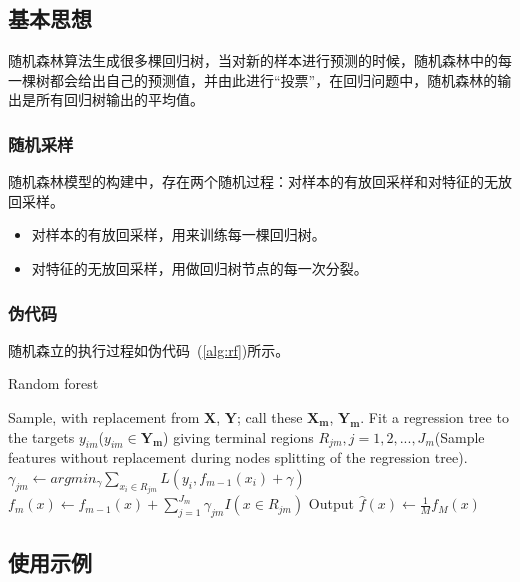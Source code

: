 \documentclass[a4paper,11pt,         %
               ]{article}
\begin{document}
\subsection{基本思想}

随机森林算法生成很多棵回归树，当对新的样本进行预测的时候，随机森林中的每一棵树都会给出自己的预测值，并由此进行“投票”，在回归问题中，随机森林的输出是所有回归树输出的平均值。

\subsubsection{随机采样}

随机森林模型的构建中，存在两个随机过程：对样本的有放回采样和对特征的无放回采样。

\begin{itemize}
  \item 对样本的有放回采样，用来训练每一棵回归树。
  \item 对特征的无放回采样，用做回归树节点的每一次分裂。
\end{itemize}

\subsubsection{伪代码}

随机森立的执行过程如伪代码~(\ref{alg:rf})所示。


\begin{algorithm}
  \caption{Random forest}
  \label{alg:rf}
  \begin{algorithmic}[1] %
    \State Sample, with replacement from $\mathbf{X}$, $\mathbf{Y}$; call these $\mathbf{X_{m}}$, $\mathbf{Y_{m}}$.
    \State Fit a regression tree to the targets $y_{im}$($y_{im} \in \mathbf{Y_{m}}$) giving terminal regions $R_{jm}, j = 1,2,...,J_{m}$(Sample features without replacement during nodes splitting of the regression tree).
      \State $\gamma_{jm} \gets argmin_{\gamma} \sum_{x_{i} \in R_{jm}} L\left ( y_{i},f_{m-1}\left ( x_{i} \right ) + \gamma \right )$
    \EndFor
    \State $f_{m}\left ( x \right ) \gets f_{m-1}\left ( x \right ) + \sum_{j=1}^{J_{m}} \gamma_{jm}I\left ( x \in R_{jm} \right )$
  \EndFor
  \State Output $\hat{f}\left ( x \right ) \gets  \frac{1}{M} f_{M}\left ( x \right )$
  \end{algorithmic}
\end{algorithm}

\subsection{使用示例}
\end{document}
